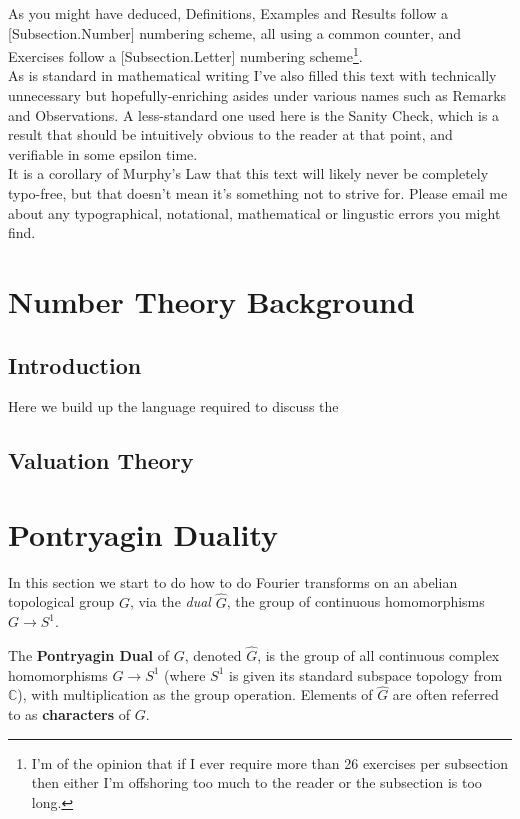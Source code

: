 \documentclass[11pt, x11names]{article}
\newcounter{exercises}
\newcommand{\cc}{\mathbb{C}}
\renewcommand{\hat}{\widehat}
\begin{document}
As you might have deduced, Definitions, Examples and Results follow a [Subsection.Number] numbering scheme, all using a common counter, and Exercises follow a [Subsection.Letter] numbering scheme\footnote{I'm of the opinion that if I ever require more than 26 exercises per subsection then either I'm offshoring too much to the reader or the subsection is too long.}.\\
As is standard in mathematical writing I've also filled this text with technically unnecessary but hopefully-enriching asides under various names such as Remarks and Observations. A less-standard one used here is the Sanity Check, which is a result that should be intuitively obvious to the reader at that point, and verifiable in some epsilon time.\\

It is a corollary of Murphy's Law that this text will likely never be completely typo-free, but that doesn't mean it's something not to strive for. Please email me about any typographical, notational, mathematical or lingustic errors you might find.



\newpage


\section{Number Theory Background}

\subsection*{Introduction}
Here we build up the language required to discuss the 

\subsection{Valuation Theory}



\newpage
\section{Pontryagin Duality}
\label{section: Pontryagin Duality}
In this section we start to do how to do Fourier transforms on an abelian topological group $G$, via the \textit{dual} $\hat{G}$, the group of continuous homomorphisms $G \to S^1$. 

\begin{defn}
The \textbf{Pontryagin Dual} of $G$, denoted $\hat{G}$, is the group of all continuous
complex homomorphisms $G \to S^1$ (where $S^1$ is given its standard subspace topology
from $\cc$), with multiplication as the group operation. Elements of $\hat{G}$ are often
referred to as \textbf{characters} of $G$.
\end{defn}
\end{document}

